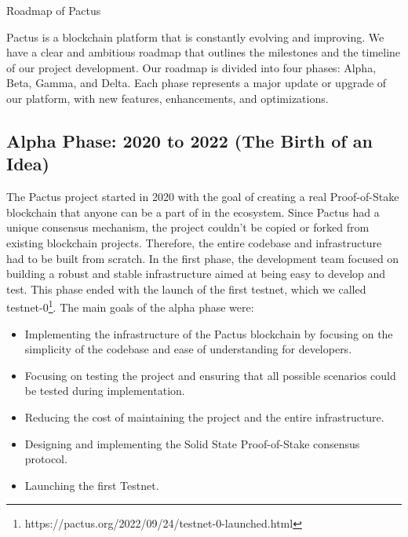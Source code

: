 \documentclass{novel}
\begin{document}
\h{Roadmap of Pactus}

Pactus is a blockchain platform that is constantly evolving and improving. We have a clear and ambitious roadmap that outlines the milestones and the timeline of our project development. Our roadmap is divided into four phases: Alpha, Beta, Gamma, and Delta. Each phase represents a major update or upgrade of our platform, with new features, enhancements, and optimizations.

\subsection{Alpha Phase: 2020 to 2022 (The Birth of an Idea)}
The Pactus project started in 2020 with the goal of creating a real Proof-of-Stake blockchain that anyone can be a part of in the ecosystem. Since Pactus had a unique consensus mechanism, the project couldn’t be copied or forked from existing blockchain projects. Therefore, the entire codebase and infrastructure had to be built from scratch. In the first phase, the development team focused on building a robust and stable infrastructure aimed at being easy to develop and test. This phase ended with the launch of the first testnet, which we called testnet-0\footnote{https://pactus.org/2022/09/24/testnet-0-launched.html}. The main goals of the alpha phase were:
\begin{itemize}
  \item
        Implementing the infrastructure of the Pactus blockchain by focusing on the simplicity of the codebase and ease of understanding for developers.
  \item
        Focusing on testing the project and ensuring that all possible scenarios could be tested during implementation.
  \item
        Reducing the cost of maintaining the project and the entire infrastructure.
  \item
        Designing and implementing the Solid State Proof-of-Stake consensus protocol.
  \item
        Launching the first Testnet.
\end{itemize}
\end{document}
